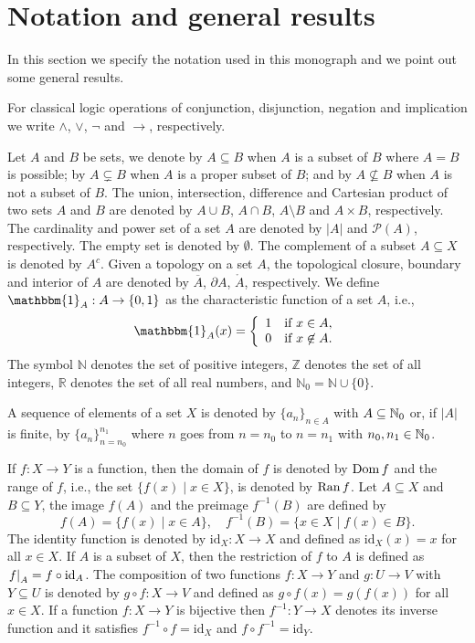 
\graphicspath{{./_figures/02_preliminaries/}}

\section{Notation and general results}\label{section:notation}
In this section we specify the notation used in this monograph and we point out some general results.

For classical logic operations of conjunction, disjunction, negation and implication we write $\wedge$, $\vee$, $\neg$ and $\to$, respectively. 

Let $A$ and $B$ be sets, we denote by $A \subseteq B$  when $A$ is a subset of $B$ where $A=B$ is possible; by $A \subsetneq B$ when $A$ is a proper subset of $B$; and by $A \not \subseteq B$ when $A$ is not a subset of $B$. The union, intersection, difference and Cartesian product of two sets $A$ and $B$ are denoted by $A \cup B$, $A \cap B$, $A \setminus B$ and $A \times B$, respectively. The cardinality and power set of a set $A$ are denoted by $|A|$ and $\mathcal{P}(A)$, respectively. The empty set is denoted by $\emptyset$. The complement of a subset $A \subseteq X$ is denoted by $A^c$. Given a topology on a set $A$, the topological closure, boundary and interior of $A$ are denoted by $\overline{A}$, $\partial A$, $\mathring A$, respectively.  We define $\mathbbm{1}_A : A \to \{0,1\}$ as the characteristic function of a set $A$, i.e., 
$$
\mathbbm{1}_A(x) = \left\{ \begin{array}{ll}
	1 &  \text{if }  x \in A, \\
	0 & \text{if }  x \not \in A.
\end{array}
\right.
$$
The symbol $\mathbb{N}$ denotes the set of positive integers, $\mathbb{Z}$ denotes the set of all integers, $\mathbb{R}$ denotes the set of all real numbers, and $\mathbb{N}_0 = \mathbb{N} \cup \{0\}$.

A sequence of elements of a set $X$ is denoted by $\displaystyle \{a_n\}_{n \in A}$ with $A \subseteq \mathbb{N}_0$ or, if $|A|$ is finite, by $\displaystyle \{a_n\}_{n=n_0}^{n_1}$ where $n$ goes from $n=n_0$ to $n=n_1$ with $n_0,n_1 \in \mathbb{N}_0$.

If $f: X \to Y$ is a function, then the domain of $f$ is denoted by $\operatorname{Dom} f$ and the range of $f$, i.e., the set $\{f(x) \mid x \in X\}$, is denoted by $\operatorname{Ran} f$. Let $A \subseteq X$ and $B \subseteq Y$, the image $f(A)$ and the preimage $f^{-1}(B)$ are defined by
$$f(A)=\{f(x) \mid x \in A\}, \quad f^{-1}(B) = \{x \in X \mid f(x) \in B\}.$$
The identity function is denoted by $\text{id}_X : X \to X$ and defined as $\text{id}_X(x)=x$ for all $x \in X$. If $A$ is a subset of $X$, then the restriction of $f$ to $A$ is defined as $\left.f\right|_{A} = f \circ \text{id}_A$. The composition of two functions $f : X \to Y$ and $g: U \to V$ with $Y \subseteq U$ is denoted by $g \circ f: X \to V$ and defined as $g \circ f(x)=g(f(x))$ for all $x \in X$. If a function $f: X \to Y$ is bijective then $f^{-1}: Y \to X$ denotes its inverse function and it satisfies $f^{-1}\circ f = \text{id}_X$ and  $f \circ f^{-1} = \text{id}_Y$.

